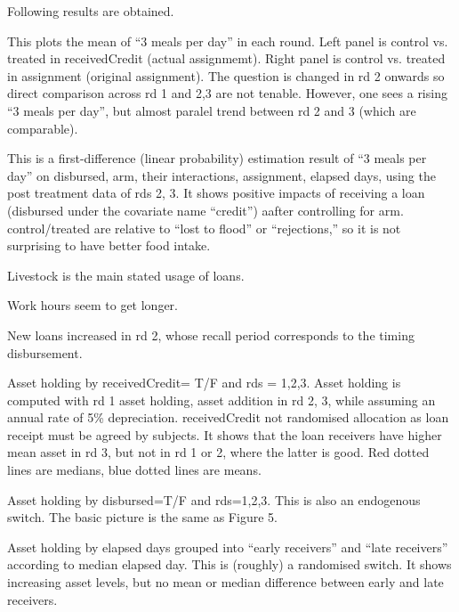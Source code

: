 Following results are obtained.
\begin{description}
\vspace{1.0ex}\setlength{\itemsep}{1.0ex}\setlength{\baselineskip}{12pt}
\item[Figure 1]	This plots the mean of ``3 meals per day'' in each round. Left panel is control vs. treated in \textsf{receivedCredit} (actual assignmemt). Right panel is control vs. treated in \textsf{assignment} (original assignment). The question is changed in rd 2 onwards so direct comparison across rd 1 and 2,3 are not tenable. However, one sees a rising ``3 meals per day'', but almost paralel trend between rd 2 and 3 (which are comparable).
\item[Table 1]	This is a first-difference (linear probability) estimation result of ``3 meals per day'' on \textsf{disbursed}, \textsf{arm}, their interactions, \textsf{assignment}, \textsf{elapsed} days, using the post treatment data of rds 2, 3. It shows positive impacts of receiving a loan (\textsf{disbursed} under the covariate name ``credit'') aafter controlling for \textsf{arm}. \textsf{control/treated} are relative to ``lost to flood'' or ``rejections,'' so it is not surprising to have better food intake.
\item[Figure 2]	Livestock is the main stated usage of loans.
\item[Figure 3]	Work hours seem to get longer.
\item[Figure 4]	New loans increased in rd 2, whose recall period corresponds to the timing disbursement.
\item[Figure 5]	Asset holding by \textsf{receivedCredit}= T/F and rds = 1,2,3. Asset holding is computed with rd 1 asset holding, asset addition in rd 2, 3, while assuming an annual rate of 5\% depreciation. \textsf{receivedCredit} not randomised allocation as loan receipt must be agreed by subjects. It shows that the loan receivers have higher mean asset in rd 3, but not in rd 1 or 2, where the latter is good. Red dotted lines are medians, blue dotted lines are means.
\item[Figure 6]	Asset holding by \textsf{disbursed}=T/F and rds=1,2,3. This is also an endogenous switch. The basic picture is the same as Figure 5.
\item[Figure 7]	Asset holding by \textsf{elapsed} days grouped into ``early receivers'' and ``late receivers'' according to median elapsed day. This is (roughly) a randomised switch. It shows increasing asset levels, but no mean or median difference between early and late receivers.

\end{description}
